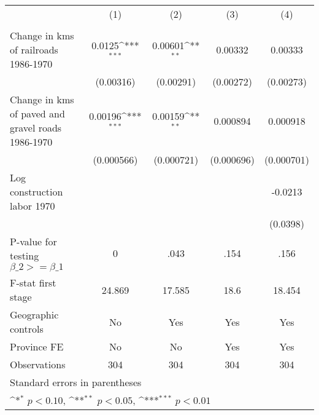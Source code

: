 {
\def\sym#1{\ifmmode^{#1}\else\(^{#1}\)\fi}
\begin{tabular}{l*{4}{c}}
\hline\hline
                &\multicolumn{1}{c}{(1)}&\multicolumn{1}{c}{(2)}&\multicolumn{1}{c}{(3)}&\multicolumn{1}{c}{(4)}\\
                &\multicolumn{1}{c}{}&\multicolumn{1}{c}{}&\multicolumn{1}{c}{}&\multicolumn{1}{c}{}\\
\hline
Change in kms of railroads 1986-1970&   0.0125\sym{***}&  0.00601\sym{**} &  0.00332         &  0.00333         \\
                &(0.00316)         &(0.00291)         &(0.00272)         &(0.00273)         \\
[1em]
Change in kms of paved and gravel roads 1986-1970&  0.00196\sym{***}&  0.00159\sym{**} & 0.000894         & 0.000918         \\
                &(0.000566)         &(0.000721)         &(0.000696)         &(0.000701)         \\
[1em]
Log construction labor 1970&                  &                  &                  &  -0.0213         \\
                &                  &                  &                  & (0.0398)         \\
\hline
P-value for testing $\beta\_{2} >= \beta\_{1}$&        0         &     .043         &     .154         &     .156         \\
F-stat first stage&   24.869         &   17.585         &     18.6         &   18.454         \\
Geographic controls&       No         &      Yes         &      Yes         &      Yes         \\
Province FE     &       No         &       No         &      Yes         &      Yes         \\
Observations    &      304         &      304         &      304         &      304         \\
\hline\hline
\multicolumn{5}{l}{\footnotesize Standard errors in parentheses}\\
\multicolumn{5}{l}{\footnotesize \sym{*} \(p<0.10\), \sym{**} \(p<0.05\), \sym{***} \(p<0.01\)}\\
\end{tabular}
}
